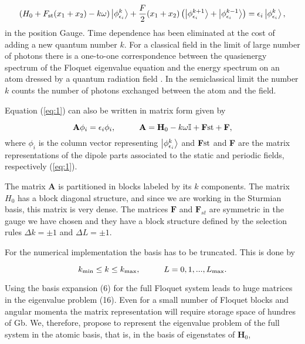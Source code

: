 \begin{equation}
(H_{0}+F_{\rm st}(x_{1}+x_{2})-k\omega)\ket{\phi_{\epsilon_{i}}^{k}}+\frac{F}{2}(x_{1}+x_{2})\left(\ket{\phi_{\epsilon_{i}}^{k+1}}+\ket{\phi_{\epsilon_{i}}^{k-1}}\right)=\epsilon_{i}\ket{\phi_{\epsilon_{i}}^{k}}\label{eq:1},
\end{equation}
in the position Gauge. Time dependence has been eliminated at the cost of adding a new quantum number $ k $. For a classical field in the limit of large number of photons there is a one-to-one correspondence between the quasienergy spectrum of the Floquet eigenvalue equation and the energy spectrum on an atom dressed by a quantum radiation field \cite{PhysRevA.58.466,PhysRev.138.B979}. In the semiclassical limit the number $ k $ counts the number of photons exchanged between the atom and the field. 

Equation (\ref{eq:1}) can also be written in matrix form given by

\begin{equation}
\textbf{A}\phi_{i}=\epsilon_{i}\phi_{i},\hspace{1cm}		\textbf{A}=\textbf{H}_{0}-k\omega \mathbb{I}+\textbf{F{\rm st}}+\textbf{F}, \label{eq: matrixfloquet} 
\end{equation}
where $ \phi_{i} $ is the column vector representing $ \ket{\phi_{\epsilon_{i}}^{k}} $ and $ \textbf{F{\rm st}} $ and \textbf{F} are the matrix representations of the dipole parts associated to the static and periodic fields, respectively (\ref{eq:1}).


The matrix $ \textbf{A} $ is partitioned in blocks labeled by its $ k $ components. The matrix $ H_{0} $ has a block diagonal structure, and since we are working in the Sturmian basis, this matrix is very dense.  The matrices $ \textbf{F} $ and $ \textbf{F}_{st} $ are symmetric in the gauge we have chosen and they have a block structure defined by the selection rules $ \Delta k=\pm 1 $ and $ \Delta L=\pm 1 $.


For the numerical implementation the basis has to be truncated. This is done by



\begin{equation}
k_{\rm min}\leq k \leq k_{\rm max},\hspace{1cm}
L=0,1,...,L_{\rm max}.
\end{equation}

Using the basis expansion (6) for the full Floquet system leads to huge matrices in the eigenvalue problem (16). Even for a small number of Floquet blocks and angular momenta the matrix representation will require storage space of hundres of Gb. We, therefore, propose to represent the eigenvalue problem of the full system in the atomic basis, that is, in the basis of eigenstates of $ \textbf{H}_{0} $,

